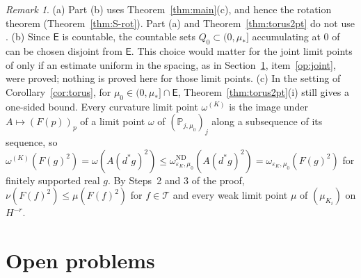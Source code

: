 \documentclass[11pt]{amsart}
\theoremstyle{plain}
\theoremstyle{definition}
\theoremstyle{remark}
\newtheorem{remark}[theorem]{Remark}
\numberwithin{equation}{section}
\newcommand{\eps}{\varepsilon}
\newcommand{\cT}{\mathcal{T}}
\begin{document}
\begin{remark}\label{rem:cortorus}
(a) Part (b) uses Theorem~\ref{thm:main}(c), and hence the rotation theorem \cite[Thm.~18.21]{S} (Theorem~\ref{thm:S-rot}). Part (a) and Theorem~\ref{thm:torus2pt} do not use \cite{S}.
(b) Since $\mathsf E$ is countable, the countable sets $Q_0\subset(0,\mu_*]$ accumulating at $0$ of \cite[Thm.~3.1(ii)]{v1} can be chosen disjoint from $\mathsf E$. This choice would matter for the joint limit points of \cite{v1} only if an estimate uniform in the spacing, as in Section~\ref{sec:open}, item~\ref{op:joint}, were proved; nothing is proved here for those limit points.
(c) In the setting of Corollary~\ref{cor:torus}, for $\mu_0\in(0,\mu_*]\cap\mathsf E$, Theorem~\ref{thm:torus2pt}(i) still gives a one-sided bound. Every curvature limit point $\omega^{(K)}$ is the image under $A\mapsto(F(p))_p$ of a limit point $\omega$ of $(\mathbb P_{j,\mu_0})_j$ along a subsequence of its sequence, so $\omega^{(K)}(F(g)^2)=\omega(A(d^*g)^2)\le\omega^{\mathrm{ND}}_{\eps_K,\mu_0}(A(d^*g)^2)=\omega_{\eps_K,\mu_0}(F(g)^2)$ for finitely supported real $g$. By Steps~2 and 3 of the proof, $\nu(F(f)^2)\le\mu(F(f)^2)$ for $f\in\cT$ and every weak limit point $\mu$ of $(\mu_{K_i})$ on $H^{-r}$.
\end{remark}

\section{Open problems}\label{sec:open}
\end{document}
